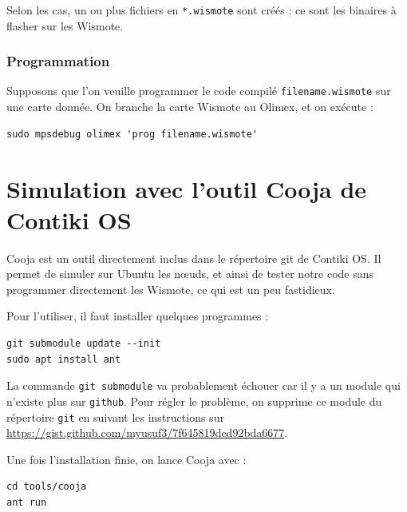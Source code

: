 \documentclass[french, a4paper, 12pt, parskip]{scrartcl}
\begin{document}
Selon les cas, un ou plus fichiers en \verb+*.wismote+ sont créés : ce sont les
binaires à flasher sur les Wismote.

\subsubsection{Programmation}

Supposons que l'on veuille programmer le code compilé \verb+filename.wismote+ sur
une carte donnée. On branche la carte Wismote au Olimex, et on exécute :

\begin{verbatim}
sudo mpsdebug olimex 'prog filename.wismote'
\end{verbatim}

\section{Simulation avec l'outil Cooja de Contiki OS}
\label{sec:cooja}

Cooja est un outil directement inclus dans le répertoire git de Contiki OS. Il
permet de simuler sur Ubuntu les nœuds, et ainsi de tester notre code sans
programmer directement les Wismote, ce qui est un peu fastidieux.

Pour l'utiliser, il faut installer quelques programmes :

\begin{verbatim}
git submodule update --init
sudo apt install ant
\end{verbatim}

La commande \verb+git submodule+ va probablement échouer car il y a un module
qui n'existe plus sur \verb+github+. Pour régler le problème, on supprime ce module du
répertoire \verb+git+ en suivant les instructions sur
\url{https://gist.github.com/myusuf3/7f645819ded92bda6677}.

Une fois l'installation finie, on lance Cooja avec :
\begin{verbatim}
cd tools/cooja
ant run
\end{verbatim}

\printbibliography
\end{document}
